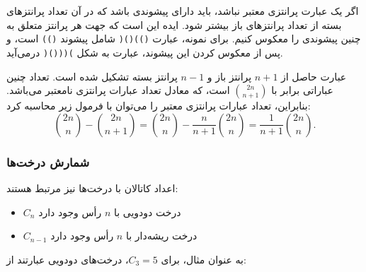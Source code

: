 اگر یک عبارت پرانتزی معتبر نباشد،
باید دارای پیشوندی باشد که در آن
تعداد پرانتزهای بسته از تعداد پرانتزهای باز بیشتر شود.
ایده این است که جهت هر پرانتز متعلق به چنین پیشوندی را معکوس کنیم.
برای نمونه، عبارت
\texttt{())()(} شامل پیشوند \texttt{())} است،
و پس از معکوس کردن این پیشوند،
عبارت به شکل \texttt{)((()(} درمی‌آید.

عبارت حاصل از $n+1$
پرانتز باز و $n-1$ پرانتز بسته تشکیل شده است.
تعداد چنین عباراتی برابر با ${2n \choose n+1}$ است،
که معادل تعداد عبارات پرانتزی نامعتبر می‌باشد.
بنابراین، تعداد عبارات پرانتزی معتبر
را می‌توان با فرمول زیر محاسبه کرد:
\[{2n \choose n}-{2n \choose n+1} = {2n \choose n} - \frac{n}{n+1} {2n \choose n} = \frac{1}{n+1} {2n \choose n}.\]

\subsubsection{شمارش درخت‌ها}

اعداد کاتالان با درخت‌ها نیز مرتبط هستند:

\begin{itemize}
\item $C_n$ درخت دودویی با $n$ رأس وجود دارد
\item $C_{n-1}$ درخت ریشه‌دار با $n$ رأس وجود دارد
\end{itemize}
\noindent
به عنوان مثال، برای $C_3=5$، درخت‌های دودویی عبارتند از:

